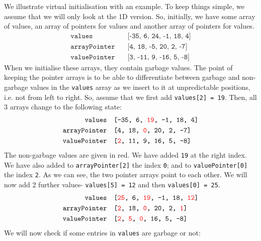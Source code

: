 \documentclass[a4paper, openany]{memoir}
\begin{document}
    We illustrate virtual initialisation with an example. To keep things simple, we assume that we will only look at the 1D version. So, initially, we have some array of values, an array of pointers for values and another array of pointers for values.
    \begin{align*}
        \texttt{values} \quad& \texttt{[-35, 6, 24, -1, 18, 4]} \\
        \texttt{arrayPointer} \quad& \texttt{[4, 18, -5, 20, 2, -7]} \\
        \texttt{valuePointer} \quad& \texttt{[3, -11, 9, -16, 5, -8]}
    \end{align*}
    When we initialise these arrays, they contain garbage values. The point of keeping the pointer arrays is to be able to differentiate between garbage and non-garbage values in the \texttt{values} array as we insert to it at unpredictable positions, i.e. not from left to right. So, assume that we first add \texttt{values[2] = 19}. Then, all 3 arrays change to the following state:
    \begin{align*}
        \texttt{values} \quad& \texttt{[-35, 6, {\color{red} 19}, -1, 18, 4]} \\
        \texttt{arrayPointer} \quad& \texttt{[4, 18, {\color{red} 0}, 20, 2, -7]} \\
        \texttt{valuePointer} \quad& \texttt{[{\color{red} 2}, 11, 9, 16, 5, -8]}
    \end{align*}
    The non-garbage values are given in red. We have added \texttt{19} at the right index. We have also added to \texttt{arrayPointer[2]} the index \texttt{0}; and to \texttt{valuePointer[0]} the index \texttt{2}. As we can see, the two pointer arrays point to each other. We will now add 2 further values- \texttt{values[5] = 12} and then \texttt{values[0] = 25}.
    \begin{align*}
        \texttt{values} \quad& \texttt{[{\color{red} 25}, 6, {\color{red} 19}, -1, 18, {\color{red} 12}]} \\
        \texttt{arrayPointer} \quad& \texttt{[{\color{red} 2}, 18, {\color{red} 0}, 20, 2, {\color{red} 1}]} \\
        \texttt{valuePointer} \quad& \texttt{[{\color{red} 2}, {\color{red} 5}, {\color{red} 0}, 16, 5, -8]}
    \end{align*}
    We will now check if some entries in \texttt{values} are garbage or not:
\end{document}
